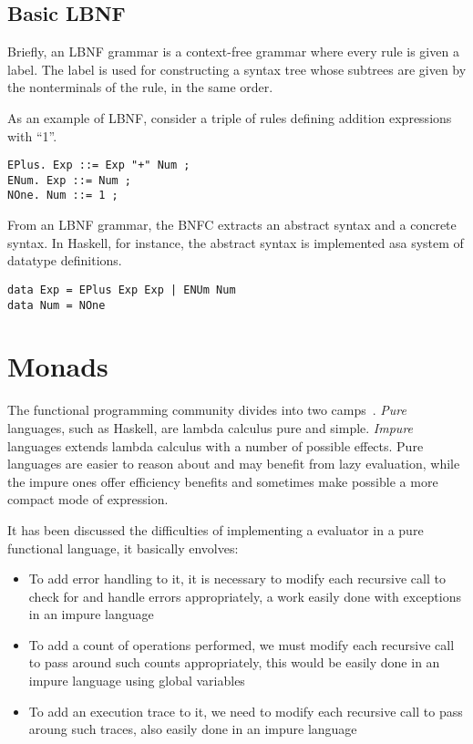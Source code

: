 \subsection{Basic LBNF}

Briefly, an LBNF grammar is a context-free grammar where every rule is given a
label. The label is used for constructing a syntax tree whose subtrees are
given by the nonterminals of the rule, in the same order.

As an example of LBNF, consider a triple of rules defining addition expressions
with ``1''.

\begin{verbatim}
EPlus. Exp ::= Exp "+" Num ;
ENum. Exp ::= Num ;
NOne. Num ::= 1 ;
\end{verbatim}

From an LBNF grammar, the BNFC extracts an abstract syntax and a concrete
syntax. In Haskell, for instance, the abstract syntax is implemented asa system
of datatype definitions.

\begin{verbatim}
data Exp = EPlus Exp Exp | ENUm Num
data Num = NOne
\end{verbatim}

\section{Monads}

The functional programming community divides into two camps~\cite{monadswadler}.
\textit{Pure} languages, such as Haskell, are lambda calculus pure and simple.
\textit{Impure} languages extends lambda calculus with a number of possible
effects. Pure languages are easier to reason about and may benefit from lazy
evaluation, while the impure ones offer efficiency benefits and sometimes make
possible a more compact mode of expression. 

It has been discussed the difficulties of implementing a evaluator in a pure
functional language, it basically envolves:
\begin{itemize}
\item To add error handling to it, it is necessary to modify each recursive call to
check for and handle errors appropriately, a work easily done with exceptions in
an impure language
\item To add a count of operations performed, we must modify each
recursive call to pass around such counts appropriately, this would be easily
done in an impure language using global variables
\item To add an execution trace to it, we need to modify each recursive call to
pass aroung such traces, also easily done in an impure language
\end{itemize}

